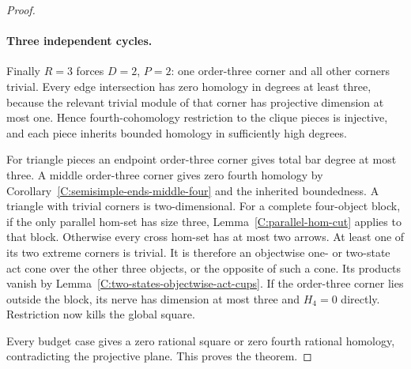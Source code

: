 \begin{proof}
\paragraph{Three independent cycles.}
Finally $R=3$ forces $D=2$, $P=2$: one order-three
corner and all other corners trivial.  Every edge
intersection has zero homology in degrees at least
three, because the relevant trivial module of that
corner has projective dimension at most one.
Hence fourth-cohomology restriction to the clique
pieces is injective, and each piece inherits bounded
homology in sufficiently high degrees.

For triangle pieces an endpoint order-three corner
gives total bar degree at most three.  A middle
order-three corner gives zero fourth homology by
Corollary~\ref{C:semisimple-ends-middle-four} and the
inherited boundedness.  A triangle with trivial
corners is two-dimensional.
For a complete four-object block, if the only parallel
hom-set has size three, Lemma~\ref{C:parallel-hom-cut}
applies to that block.  Otherwise every cross hom-set
has at most two arrows.  At least one of its two extreme
corners is trivial.  It is therefore an objectwise
one- or two-state act cone over the other three objects,
or the opposite of such a cone.  Its products vanish
by Lemma~\ref{C:two-states-objectwise-act-cups}.
If the order-three corner lies outside the block, its
nerve has dimension at most three and $H_4=0$ directly.
Restriction now kills the global square.

Every budget case gives a zero rational square or zero
fourth rational homology, contradicting the projective
plane.  This proves the theorem.
\end{proof}

